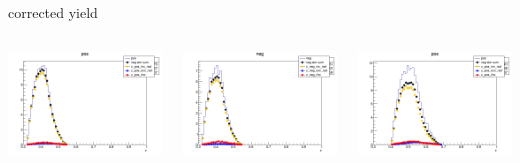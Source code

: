\begin{frame}{corrected yield}
\begin{columns}
\begin{column}[T]{0.25\textwidth}
\includegraphics[width = \textwidth]{results/yield/statistics_corr/yield_x_Q2_z_0.60_4.775_0.40_pos.png}
\end{column}
\begin{column}[T]{0.25\textwidth}
\includegraphics[width = \textwidth]{results/yield/statistics_corr/yield_x_Q2_z_0.60_4.775_0.40_neg.png}
\end{column}
\begin{column}[T]{0.25\textwidth}
\includegraphics[width = \textwidth]{results/yield/statistics_corr/yield_x_Q2_z_0.60_4.775_0.50_pos.png}

\end{column}
\end{columns}
\end{frame}
